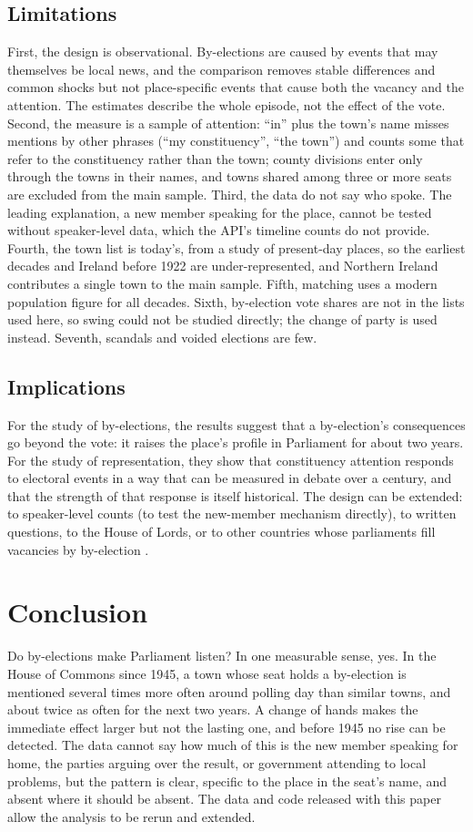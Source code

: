 \documentclass[11pt,a4paper]{article}
\begin{document}
\subsection{Limitations}
First, the design is observational. By-elections are caused by events that may themselves be local news, and the comparison removes stable differences and common shocks but not place-specific events that cause both the vacancy and the attention. The estimates describe the whole episode, not the effect of the vote. Second, the measure is a sample of attention: ``in'' plus the town's name misses mentions by other phrases (``my constituency'', ``the town'') and counts some that refer to the constituency rather than the town; county divisions enter only through the towns in their names, and towns shared among three or more seats are excluded from the main sample. Third, the data do not say who spoke. The leading explanation, a new member speaking for the place, cannot be tested without speaker-level data, which the API's timeline counts do not provide. Fourth, the town list is today's, from a study of present-day places, so the earliest decades and Ireland before 1922 are under-represented, and Northern Ireland contributes a single town to the main sample. Fifth, matching uses a modern population figure for all decades. Sixth, by-election vote shares are not in the lists used here, so swing could not be studied directly; the change of party is used instead. Seventh, scandals and voided elections are few.

\subsection{Implications}
For the study of by-elections, the results suggest that a by-election's consequences go beyond the vote: it raises the place's profile in Parliament for about two years. For the study of representation, they show that constituency attention responds to electoral events in a way that can be measured in debate over a century, and that the strength of that response is itself historical. The design can be extended: to speaker-level counts (to test the new-member mechanism directly), to written questions, to the House of Lords, or to other countries whose parliaments fill vacancies by by-election \citep{loewen2010,studlar1987}.

\section{Conclusion}\label{sec:conc}
Do by-elections make Parliament listen? In one measurable sense, yes. In the House of Commons since 1945, a town whose seat holds a by-election is mentioned several times more often around polling day than similar towns, and about twice as often for the next two years. A change of hands makes the immediate effect larger but not the lasting one, and before 1945 no rise can be detected. The data cannot say how much of this is the new member speaking for home, the parties arguing over the result, or government attending to local problems, but the pattern is clear, specific to the place in the seat's name, and absent where it should be absent. The data and code released with this paper allow the analysis to be rerun and extended.
\end{document}
